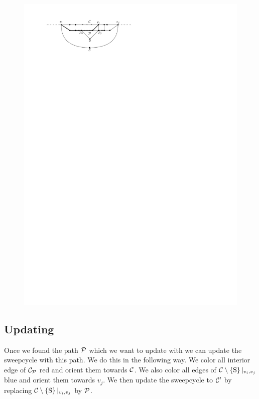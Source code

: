     \begin{figure}[h]
      \centering
      \includegraphics[scale=1]{unifiedAlgo/img/sweep/free2chord}
      \caption{}
      \label{fig:sweep:free2chord}
    \end{figure}

    \subsection{Updating}
      \label{ss:sweep:Update}
      Once we found the path $\P$ which we want to update with we can update the sweepcycle with this path. We do this in the following way. We color all interior edge of $\C_\P$ red and orient them towards $\C$. We also color all edges of $\cpath|_{v_i,v_j}$  blue and orient them towards $v_j$. We then update the sweepcycle to $\C'$ by replacing $\cpath|_{v_i,v_j}$ by $\P$.


